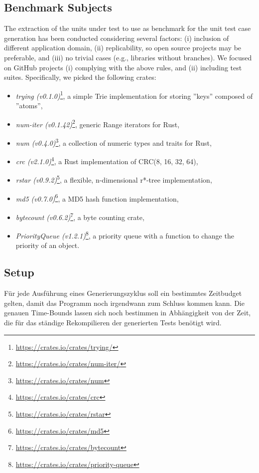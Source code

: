 \documentclass{article}
\begin{document}
\subsection{Benchmark Subjects}
The extraction of the units under test to use as benchmark for the unit test case generation has been conducted considering several factors: (i) inclusion of different application domain, (ii) replicability, so open source projects may be preferable, and (iii) no trivial cases (e.g., libraries without branches). We focused on GitHub projects (i) complying with the above rules, and (ii) including test suites. Specifically, we picked the following crates: 
\begin{itemize}
    \item \textit{trying (v0.1.0)}\footnote{\url{https://crates.io/crates/trying/}}, a simple Trie implementation for storing ''keys'' composed of ''atoms'',
    \item \textit{num-iter (v0.1.42)}\footnote{\url{https://crates.io/crates/num-iter/}}, generic Range iterators for Rust,
    \item \textit{num (v0.4.0)}\footnote{\url{https://crates.io/crates/num}}, a collection of numeric types and traits for Rust,
    \item \textit{crc (v2.1.0)}\footnote{\url{https://crates.io/crates/crc}}, a Rust implementation of CRC(8, 16, 32, 64),
    \item \textit{rstar (v0.9.2)}\footnote{\url{https://crates.io/crates/rstar}}, a flexible, n-dimensional r*-tree implementation,
    \item \textit{md5 (v0.7.0)}\footnote{\url{https://crates.io/crates/md5}}, a MD5 hash function implementation,
    \item \textit{bytecount (v0.6.2)}\footnote{\url{https://crates.io/crates/bytecount}}, a byte counting crate,
    \item \textit{PriorityQueue (v1.2.1)}\footnote{\url{https://crates.io/crates/priority-queue}}, a priority queue with a function to change the priority of an object.
\end{itemize}

\subsection{Setup}
Für jede Ausführung eines Generierungszyklus soll ein bestimmtes Zeitbudget gelten, damit das Programm noch irgendwann zum Schluss kommen kann. Die genauen Time-Bounds lassen sich noch bestimmen in Abhängigkeit von der Zeit, die für das ständige Rekompilieren der generierten Tests benötigt wird. 
\end{document}
